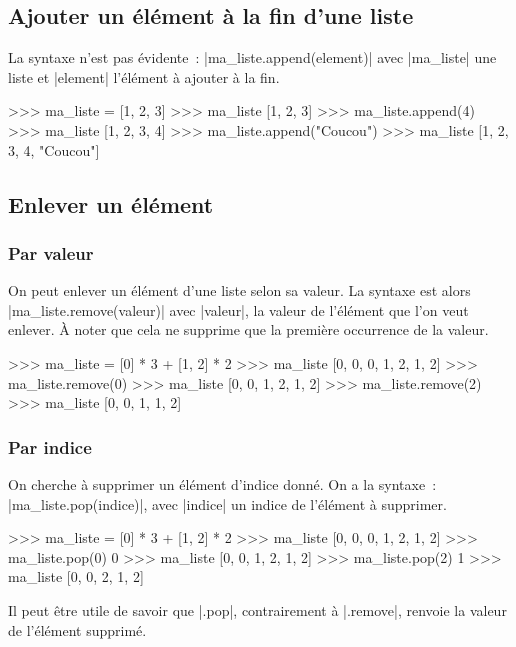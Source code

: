 	\subsection{Ajouter un élément à la fin d'une liste}
		
		La syntaxe n'est pas évidente~: \python|ma_liste.append(element)| avec \python|ma_liste| une liste et \python|element| l'élément à ajouter à la fin.
		\begin{pythoncode}
			>>> ma_liste = [1, 2, 3]
			>>> ma_liste
			[1, 2, 3]
			>>> ma_liste.append(4)
			>>> ma_liste
			[1, 2, 3, 4]
			>>> ma_liste.append("Coucou")
			>>> ma_liste
			[1, 2, 3, 4, "Coucou"]
		\end{pythoncode}
	
	\subsection{Enlever un élément}
	
		\subsubsection{Par valeur}
		On peut enlever un élément d'une liste selon sa valeur. La syntaxe est alors \python|ma_liste.remove(valeur)| avec \python|valeur|, la valeur de l'élément que l'on veut enlever. À noter que cela ne supprime que la première occurrence de la valeur.
		\begin{pythoncode}
			>>> ma_liste = [0] * 3 + [1, 2] * 2
			>>> ma_liste
			[0, 0, 0, 1, 2, 1, 2]
			>>> ma_liste.remove(0)
			>>> ma_liste
			[0, 0, 1, 2, 1, 2]
			>>> ma_liste.remove(2)
			>>> ma_liste
			[0, 0, 1, 1, 2]
		\end{pythoncode}
		
		\subsubsection{Par indice} On cherche à supprimer un élément d'indice donné. On a la syntaxe~: \python|ma_liste.pop(indice)|, avec \python|indice| un indice de l'élément à supprimer.
		\begin{pythoncode}
			>>> ma_liste = [0] * 3 + [1, 2] * 2
			>>> ma_liste
			[0, 0, 0, 1, 2, 1, 2]
			>>> ma_liste.pop(0)
			0
			>>> ma_liste
			[0, 0, 1, 2, 1, 2]
			>>> ma_liste.pop(2)
			1
			>>> ma_liste
			[0, 0, 2, 1, 2]
		\end{pythoncode}
		Il peut être utile de savoir que \python|.pop|, contrairement à \python|.remove|, renvoie la valeur de l'élément supprimé.

